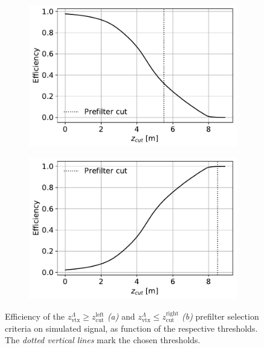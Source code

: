 \begin{figure}[t]
	\centering
	\begin{subfigure}{.45\textwidth}
		\includegraphics[width=\textwidth]{graphics/04-event_selection/LEVz_left.pdf}
		\caption{}
	\end{subfigure}
	\begin{subfigure}{.45\textwidth}
		\includegraphics[width=\textwidth]{graphics/04-event_selection/LEVz_right.pdf}
		\caption{}
	\end{subfigure}
	\caption{Efficiency of the $z_\text{vtx}^\Lambda \geq z_\text{cut}^\text{left}$ \textit{(a)} and $z_\text{vtx}^\Lambda \leq z_\text{cut}^\text{right}$ \textit{(b)} prefilter selection criteria on \demonstratorshort simulated signal, as function of the respective thresholds. The \textit{dotted vertical lines} mark the chosen thresholds.}
	\label{fig:4:z_lambda_cuts}
\end{figure}

